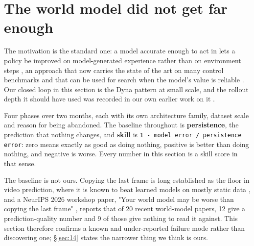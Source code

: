 \documentclass[11pt]{article}
\begin{document}
\section{The world model did not get far enough}
\label{sec:7}

The motivation is the standard one: a model accurate enough to act in lets a policy be improved on model-generated experience rather than on environment steps \cite{sutton1991dyna,ha2018worldmodels,hafner2020dreamer}, an approach that now carries the state of the art on many control benchmarks \cite{hafner2025dreamerv3} and that can be used for search when the model's value is reliable \cite{schrittwieser2020muzero}. Our closed loop in this section is the Dyna pattern at small scale, and the rollout depth it should have used was recorded in our own earlier work on it \cite{kieto2026dyna}.

Four phases over two months, each with its own architecture family, dataset scale and reason for being abandoned. The baseline throughout is \textbf{persistence}, the prediction that nothing changes, and \textbf{skill} is \texttt{1 -\allowbreak{} model error /\allowbreak{} persistence error}: zero means exactly as good as doing nothing, positive is better than doing nothing, and negative is worse. Every number in this section is a skill score in that sense.

The baseline is not ours. Copying the last frame is long established as the floor in video prediction, where it is known to beat learned models on mostly static data \cite{villegas2019highfidelity,villegas2017mcnet}, and a NeurIPS 2026 workshop paper, "Your world model may be worse than copying the last frame" \cite{surazhsky2026copyframe}, reports that of 20 recent world-model papers, 12 give a prediction-quality number and 9 of those give nothing to read it against. This section therefore confirms a known and under-reported failure mode rather than discovering one; \S\ref{sec:14} states the narrower thing we think is ours.
\end{document}
